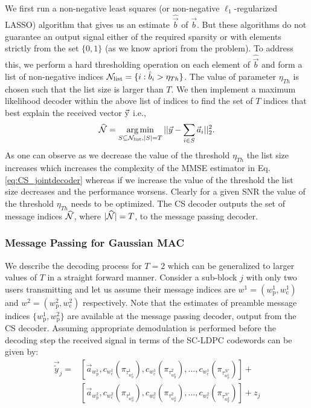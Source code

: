 We first run a non-negative least squares (or non-negative $\ell_1$-regularized LASSO) algorithm that gives us an estimate $\hat{\vec{b}}$ of $\vec{b}$. But these algorithms do not guarantee an output signal either of the required sparsity or with elements strictly from the set $\{0,1\}$ (as we know apriori from the problem). To address this, we perform a hard thresholding operation on each element of $\hat{\vec{b}}$ and form a list of non-negative indices
$\mathcal{N}_{\text{list}}=\{i:\hat{b}_i>\eta_{Th}\}$. The value of parameter $\eta_{Th}$ is chosen such that the list size is larger than $T$. We then implement a maximum likelihood decoder within the above list of indices to find the set of $T$ indices that best explain the received vector $\vec{\mathrm{y}}$ i.e.,
\begin{equation}
\widehat{\mathcal{N}}=\operatorname*{arg\,min}_{S\subseteq\mathcal{N}_{\text{list}},|S|=T}||\vec{y}-\sum_{i\in S}\vec{a}_i||^2_2.
\label{eq:CS_jointdecoder}
\end{equation}
As one can observe as we decrease the value of the threshold $\eta_{Th}$ the list size increases which increases the complexity of the MMSE estimator in Eq. \eqref{eq:CS_jointdecoder} whereas if we increase the value of the threshold the list size decreases and the performance worsens. Clearly for a given SNR the value of the threshold $\eta_{Th}$ needs to be optimized. The CS decoder outputs the set of message indices $\widehat{\mathcal{N}}$, where $|\widehat{\mathcal{N}}|=T$, to the message passing decoder.

\subsubsection{Message Passing for Gaussian MAC}
\label{sec:BP_GMAC}
We describe the decoding process for $T=2$ which can be generalized to larger values of $T$ in a straight forward manner. Consider a sub-block $j$ with only two users transmitting and let us assume their message indices are $w^1=(w^1_\mathrm{p},w^1_\mathrm{c})$ and $w^2=(w^2_\mathrm{p},w^2_\mathrm{c})$ respectively. Note that the estimates of preamble message indices $\{w^1_\mathrm{p},w^2_\mathrm{p}\}$ are available at the message passing decoder, output from the CS decoder. Assuming appropriate demodulation is performed before the decoding step the received signal in terms of the SC-LDPC codewords can be given by:
\begin{align*}
\vec{\tilde{y}}_j= &[\vec{a}_{w^1_\mathrm{p}},c_{w^1_\mathrm{c}}(\pi_{\tau_{w^1_\mathrm{p}}^1}),c_{w^1_\mathrm{c}}(\pi_{\tau_{w^1_\mathrm{p}}^2}),\ldots,c_{w^1_\mathrm{c}}(\pi_{\tau_{w^1_\mathrm{p}}^{N'}})]+\\
&[\vec{a}_{w^2_\mathrm{p}},c_{w^2_\mathrm{c}}(\pi_{\tau_{w^2_\mathrm{p}}^1}),c_{w^2_\mathrm{c}}(\pi_{\tau_{w^2_\mathrm{p}}^2}),\ldots,c_{w^2_\mathrm{c}}(\pi_{\tau_{w^2_\mathrm{p}}^{N'}})]+z_j
\end{align*}

